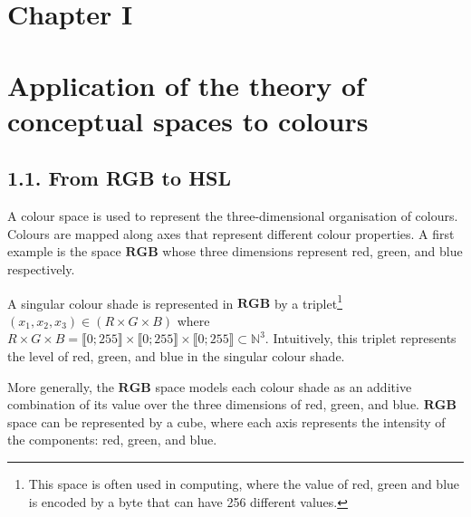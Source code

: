 \documentclass{article}
\begin{document}
\section*{\centering Chapter I}
\section*{\centering Application of the theory of conceptual spaces to colours}

\subsection*{1.1. From RGB to HSL}

\hspace*{\parindent}A colour space is used to represent the three-dimensional organisation of colours. Colours are mapped along axes that represent different colour properties. A first example is the space $\mathbf{RGB}$ whose three dimensions represent red, green, and blue respectively.

A singular colour shade is represented in $\mathbf{RGB}$ by a triplet\footnote{This space is often used in computing, where the value of red, green and blue is encoded by a byte that can have 256 different values.} $\left(x_1,x_2,x_3\right) \in \left(R \times G \times B\right)$ where $R \times G \times B = \llbracket 0 ; 255 \rrbracket \times \llbracket 0 ; 255 \rrbracket \times \llbracket 0 ; 255 \rrbracket \subset \mathbb{N}^3$. Intuitively, this triplet represents the level of red, green, and blue in the singular colour shade.

More generally, the $\mathbf{RGB}$ space models each colour shade as an additive combination of its value over the three dimensions of red, green, and blue. $\mathbf{RGB}$ space can be represented by a cube, where each axis represents the intensity of the components: red, green, and blue.
\end{document}
